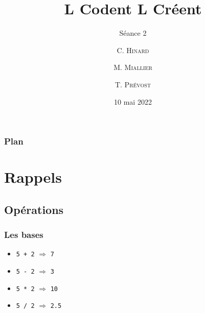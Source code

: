 \documentclass{beamer}
\title %
{L Codent L Créent}
\subtitle{Séance 2}
\author[ENSTA Bretagne] %
{C. \textsc{Hinard} \and M. \textsc{Miallier} \and T. \textsc{Prévost}}
\institute[] %
{
  ENSTA Bretagne
  \and
  Collège Croas ar Pennoc
}
\date[Séance 2] %
{10 mai 2022}
\begin{document}
\frame{\titlepage}


\begin{frame}
\frametitle{Plan}
\tableofcontents
\end{frame}


\section{Rappels}\label{sec:rappels}
   \subsection{Opérations}\label{subsec:operations}

\begin{frame}
\frametitle{Les bases}

\begin{itemize}
    \item<1-> \texttt{5 + 2} $\Longrightarrow$ \pause \texttt{7} \pause
    \item<2-> \texttt{5 - 2} $\Longrightarrow$ \pause \texttt{3} \pause
    \item<3-> \texttt{5 * 2} $\Longrightarrow$ \pause \texttt{10} \pause
    \item<4-> \texttt{5 / 2} $\Longrightarrow$ \pause \texttt{2.5}

\end{itemize}
\end{frame}
\end{document}
